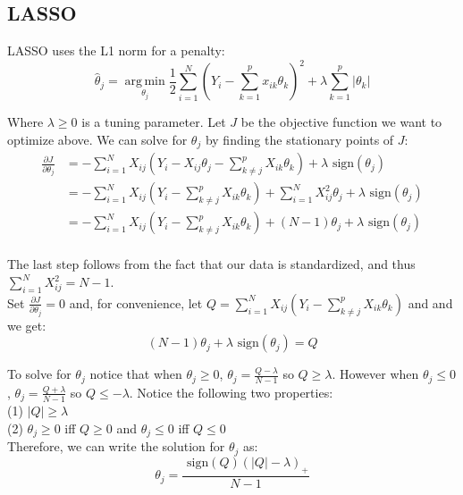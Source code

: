 \documentclass[11pt]{article}
\newcommand{\thh}{\hat{\theta}}
\newcommand{\sgn}{\text{ sign}}
\DeclareMathOperator*{\argmin}{arg\,min}
\begin{document}
\subsection{LASSO}
LASSO uses the L1 norm for a penalty:
	$$\thh_j = \argmin\limits_{\theta_j} \frac{1}{2} \sum\limits_{i=1}^N \left(Y_i - \sum\limits_{k=1}^px_{ik}\theta_k \right)^2 + \lambda \sum\limits_{k=1}^p|\theta_k|$$

Where $\lambda \geq 0$ is a tuning parameter.  Let $J$ be the objective function we want to optimize above.  We can solve for $\theta_j$ by finding the stationary points of $J$:
\begin{equation}\begin{split}
	\frac{\partial J}{\partial \theta_j}
		& = -\sum\limits_{i=1}^N X_{ij}(Y_i - X_{ij}\theta_j - \sum\limits_{k \ne j}^p X_{ik}\theta_k) + \lambda \sgn(\theta_j) \\
		& = -\sum\limits_{i=1}^N X_{ij}(Y_i - \sum\limits_{k \ne j}^p X_{ik}\theta_k) + \sum\limits_{i=1}^NX_{ij}^2\theta_j + \lambda \sgn(\theta_j) \\
		& = -\sum\limits_{i=1}^N X_{ij}(Y_i - \sum\limits_{k \ne j}^p X_{ik}\theta_k) +(N-1)\theta_j + \lambda \sgn(\theta_j) \\
\end{split}\end{equation}

The last step follows from the fact that our data is standardized, and thus $\sum\limits_{i=1}^NX_{ij}^2 = N-1$.  \\

Set $\frac{\partial J}{\partial \theta_j}=0$ and, for convenience, let $Q = \sum\limits_{i=1}^N X_{ij}(Y_i - \sum\limits_{k \ne j}^p X_{ik}\theta_k)$ and and we get:
	$$(N-1)\theta_j + \lambda\sgn(\theta_j) = Q$$

To solve for $\theta_j$ notice that when $\theta_j \geq 0$, $\theta_j=\frac{Q-\lambda}{N-1}$ so $Q \geq \lambda$.  However when $\theta_j \leq 0$, $\theta_j=\frac{Q+\lambda}{N-1}$ so $Q \leq -\lambda$.  Notice the following two properties: \\
	\hspace*{1cm} (1) $|Q| \geq \lambda$ \\
	\hspace*{1cm} (2) $\theta_j \geq 0$ iff $Q \geq 0$ and $\theta_j \leq 0$ iff $Q \leq 0$ \\

Therefore, we can write the solution for $\theta_j$ as:
	$$\theta_j = \frac{\sgn(Q)(|Q|-\lambda)_+}{N-1}$$
\end{document}
